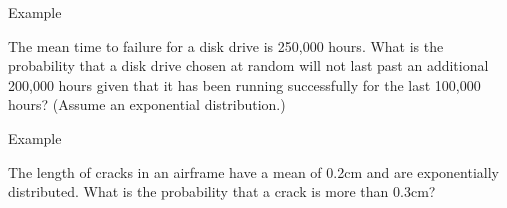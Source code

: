 \begin{frame}{Example}

  The mean time to failure for a disk drive is 250,000 hours. What is
  the probability that a disk drive chosen at random will not last
  past an additional 200,000 hours given that it has been running
  successfully for the last 100,000 hours? (Assume an exponential
  distribution.)
  
\end{frame}

\begin{frame}{Example}

  The length of cracks in an airframe have a mean of 0.2cm and are
  exponentially distributed. What is the probability that a crack is
  more than 0.3cm?
  
\end{frame}


